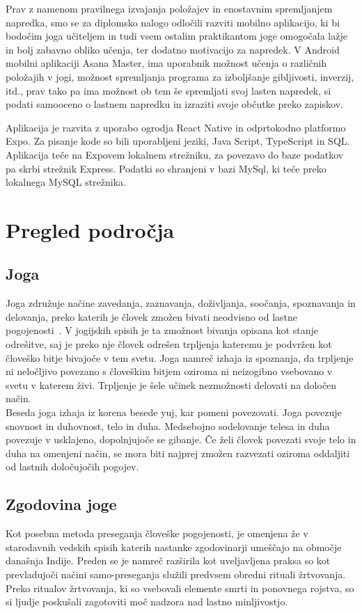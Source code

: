 \documentclass[a4paper, 12pt]{book}
\begin{document}
Prav z namenom pravilnega izvajanja položajev in enostavnim spremljanjem napredka, smo se za diplomsko nalogo odločili razviti mobilno aplikacijo, ki bi bodočim joga učiteljem in tudi vsem ostalim praktikantom joge omogočala lažje in bolj zabavno obliko učenja, ter dodatno motivacijo za napredek. V Android mobilni aplikaciji Asana Master, ima uporabnik  možnost učenja o različnih položajih v jogi, možnost spremljanja programa za izboljšanje gibljivosti, inverzij, itd., prav tako pa ima možnost ob tem še spremljati svoj lasten napredek, si podati samooceno o lastnem napredku in izraziti svoje občutke preko zapiskov.

Aplikacija je razvita z uporabo ogrodja React Native in odprtokodno platformo Expo. Za pisanje kode so bili uporabljeni jeziki, Java Script, TypeScript in SQL. Aplikacija teče na Expovem lokalnem strežniku, za povezavo do baze podatkov pa skrbi strežnik Express. Podatki so shranjeni v bazi MySql, ki teče preko lokalnega MySQL strežnika.


\chapter{Pregled področja}
\label{ch0}

\section{Joga}
Joga združuje načine zavedanja, zaznavanja, doživljanja, soočanja, spoznavanja in delovanja, preko katerih je človek zmožen bivati neodvisno od lastne pogojenosti~\cite{oJogi}. V jogijskih spisih je ta zmožnost bivanja opisana kot stanje odrešitve, saj je preko nje človek odrešen trpljenja kateremu je podvržen kot človeško bitje bivajoče v tem svetu. Joga namreč izhaja iz spoznanja, da trpljenje ni neločljivo povezano s človeškim bitjem oziroma ni neizogibno vsebovano v svetu v katerem živi. Trpljenje je šele učinek nezmožnosti delovati na določen način. \\ 

Beseda joga izhaja iz korena besede yuj, kar pomeni povezovati. Joga povezuje snovnost in duhovnost, telo in duha. Medsebojno sodelovanje telesa in duha povezuje v usklajeno, dopolnjujoče se gibanje. Če želi človek povezati svoje telo in duha na omenjeni način, se mora biti najprej zmožen razvezati oziroma oddaljiti od lastnih določujočih pogojev.\\ 

\section{Zgodovina joge}
Kot posebna metoda preseganja človeške pogojenosti, je omenjena že v starodavnih vedskih spisih katerih nastanke zgodovinarji umeščajo na območje današnja Indije. Preden se je namreč razširila kot uveljavljena praksa so kot prevladujoči načini samo-preseganja služili predvsem obredni rituali žrtvovanja. Preko ritualov žrtvovanja, ki so vsebovali elemente smrti in ponovnega rojstva, so si ljudje poskušali zagotoviti moč nadzora nad lastno minljivostjo. 
\end{document}

